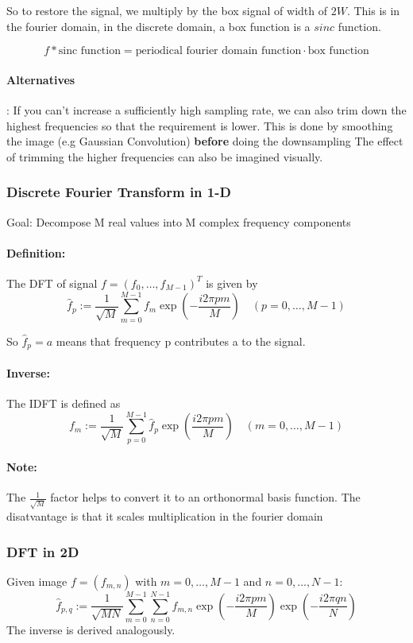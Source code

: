 \documentclass{article}
\begin{document}
So to restore the signal, we multiply by the box signal of width of $2W$. This is in the fourier domain, in the discrete domain, a box function is a $sinc$ function.

\[f \ast \text{sinc function} = \text{periodical fourier domain function} \cdot \text{box function} \]

\paragraph{Alternatives}: If you can't increase a sufficiently high sampling rate, we can also trim down the highest frequencies so that the requirement is lower. This is done by smoothing the image (e.g Gaussian Convolution) \textbf{before} doing the downsampling
The effect of trimming the higher frequencies can also be imagined visually.

\subsubsection{Discrete Fourier Transform in 1-D}
Goal: Decompose M real values into M complex frequency components

\paragraph{Definition: } The DFT of signal $f = (f_0,\dots,f_{M-1})^T$ is given by
\[\hat{f}_p := \frac{1}{\sqrt{M}}\sum_{m = 0}^{M-1}f_m \exp\left(-\frac{i2\pi pm}{M}\right) \quad (p = 0,\dots,M-1)\]

So $\hat{f}_p = a$ means that frequency p contributes a to the signal.

\paragraph{Inverse: } The IDFT is defined as
\[f_m := \frac{1}{\sqrt{M}}\sum_{p = 0}^{M-1}\hat{f}_p \exp\left(\frac{i2\pi pm}{M}\right) \quad (m = 0,\dots,M-1)\]

\paragraph{Note: } The $\frac{1}{\sqrt{M}}$ factor helps to convert it to an orthonormal basis function. The disatvantage is that it scales multiplication in the fourier domain

\subsubsection{DFT in 2D}
Given image $f = (f_{m,n})$ with $m = 0,\dots,M-1$ and $n = 0,\dots,N-1$:
\[
  \hat{f}_{p,q} := \frac{1}{\sqrt{MN}}
  \sum_{m=0}^{M-1}\sum_{n=0}^{N-1}
  f_{m,n}
  \exp\!\left(-\frac{i2\pi pm}{M}\right)
  \exp\!\left(-\frac{i2\pi qn}{N}\right)
\]
The inverse is derived analogously.
\end{document}
